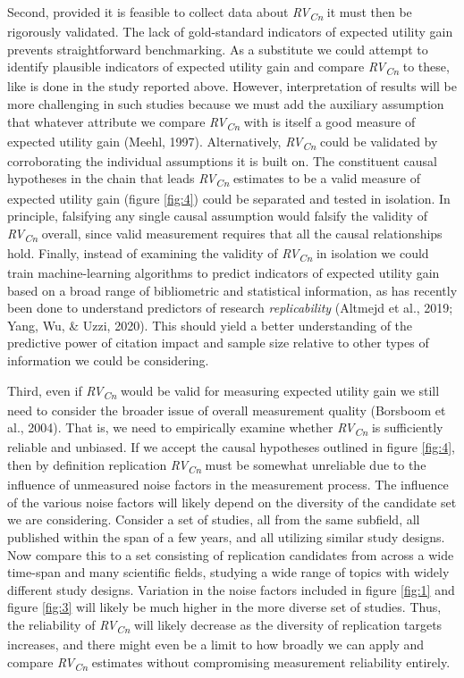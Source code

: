 \documentclass[
  english,
  jou,floatsintext]{apa6}
\begin{document}
Second, provided it is feasible to collect data about \emph{RV\textsubscript{Cn}} it must then be rigorously validated. The lack of gold-standard indicators of expected utility gain prevents straightforward benchmarking. As a substitute we could attempt to identify plausible indicators of expected utility gain and compare \emph{RV\textsubscript{Cn}} to these, like is done in the study reported above. However, interpretation of results will be more challenging in such studies because we must add the auxiliary assumption that whatever attribute we compare \emph{RV\textsubscript{Cn}} with is itself a good measure of expected utility gain (Meehl, 1997). Alternatively, \emph{RV\textsubscript{Cn}} could be validated by corroborating the individual assumptions it is built on. The constituent causal hypotheses in the chain that leads \emph{RV\textsubscript{Cn}} estimates to be a valid measure of expected utility gain (figure \ref{fig:4}) could be separated and tested in isolation. In principle, falsifying any single causal assumption would falsify the validity of \emph{RV\textsubscript{Cn}} overall, since valid measurement requires that all the causal relationships hold. Finally, instead of examining the validity of \emph{RV\textsubscript{Cn}} in isolation we could train machine-learning algorithms to predict indicators of expected utility gain based on a broad range of bibliometric and statistical information, as has recently been done to understand predictors of research \emph{replicability} (Altmejd et al., 2019; Yang, Wu, \& Uzzi, 2020). This should yield a better understanding of the predictive power of citation impact and sample size relative to other types of information we could be considering.

Third, even if \emph{RV\textsubscript{Cn}} would be valid for measuring expected utility gain we still need to consider the broader issue of overall measurement quality (Borsboom et al., 2004). That is, we need to empirically examine whether \emph{RV\textsubscript{Cn}} is sufficiently reliable and unbiased. If we accept the causal hypotheses outlined in figure \ref{fig:4}, then by definition replication \emph{RV\textsubscript{Cn}} must be somewhat unreliable due to the influence of unmeasured noise factors in the measurement process. The influence of the various noise factors will likely depend on the diversity of the candidate set we are considering. Consider a set of studies, all from the same subfield, all published within the span of a few years, and all utilizing similar study designs. Now compare this to a set consisting of replication candidates from across a wide time-span and many scientific fields, studying a wide range of topics with widely different study designs. Variation in the noise factors included in figure \ref{fig:1} and figure \ref{fig:3} will likely be much higher in the more diverse set of studies. Thus, the reliability of \emph{RV\textsubscript{Cn}} will likely decrease as the diversity of replication targets increases, and there might even be a limit to how broadly we can apply and compare \emph{RV\textsubscript{Cn}} estimates without compromising measurement reliability entirely.
\end{document}
